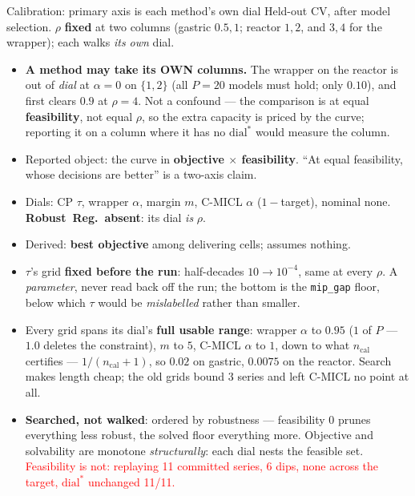 \documentclass{beamer}
\newcommand{\mc}[1]{\textcolor{red}{#1}}
\begin{document}
\begin{frame}{Calibration: primary axis is each method's own dial}
  Held-out CV, after model selection. $\rho$ \textbf{fixed} at two columns
  (gastric $0.5,1$; reactor $1,2$, and $3,4$ for the wrapper); each walks
  \emph{its own} dial.
  \begin{itemize}
    \item \textbf{A method may take its OWN columns.} The wrapper on the
      reactor is out of \emph{dial} at $\alpha{=}0$ on $\{1,2\}$ (all $P{=}20$
      models must hold; only $0.10$), and first clears $0.9$ at $\rho{=}4$. Not
      a confound --- the comparison is at equal \textbf{feasibility}, not equal
      $\rho$, so the extra capacity is priced by the curve; reporting it on a
      column where it has no $\text{dial}^\ast$ would measure the column.
    \item Reported object: the curve in \textbf{objective $\times$ feasibility}.
      ``At equal feasibility, whose decisions are better'' is a two-axis claim.
    \item Dials: CP $\tau$, wrapper $\alpha$, margin $m$, C-MICL $\alpha$
      ($1-$target), nominal none. \textbf{Robust~Reg.\ absent}: its dial \emph{is} $\rho$.
    \item Derived: \textbf{best objective} among delivering cells; assumes nothing.
    \item $\tau$'s grid \textbf{fixed before the run}: half-decades
      $10\!\to\!10^{-4}$, same at every $\rho$. A \emph{parameter}, never read back
      off the run; the bottom is the \texttt{mip\_gap} floor, below which $\tau$
      would be \emph{mislabelled} rather than smaller.
    \item Every grid spans its dial's \textbf{full usable range}: wrapper $\alpha$
      to $0.95$ ($1$ of $P$ --- $1.0$ deletes the constraint), $m$ to $5$, C-MICL
      $\alpha$ to $1$, down to what $n_{\text{cal}}$ certifies --- $1/(n_{\text{cal}}{+}1)$,
      so $0.02$ on gastric, $0.0075$ on the reactor. Search makes length cheap; the
      old grids bound 3 series and left C-MICL no point at all.
    \item \textbf{Searched, not walked}: ordered by robustness --- feasibility $0$
      prunes everything less robust, the solved floor everything more. Objective and
      solvability are monotone \emph{structurally}: each dial nests the feasible set.
      \mc{Feasibility is not: replaying 11 committed series, 6 dips, none across
      the target, $\text{dial}^\ast$ unchanged 11/11.}
  \end{itemize}
\end{frame}
\end{document}
